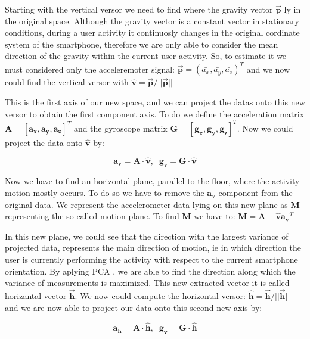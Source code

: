 Starting with the vertical versor we need to find where the gravity vector $\boldsymbol{\vec{p}}$ ly in the original space. Although the gravity vector is a constant vector in stationary conditions, during a user activity it continuosly changes in the original cordinate system of the smartphone, therefore we are only able to consider the mean direction of the gravity within the current user activity. So, to estimate it we must considered only the acceleremoter signal: $ \boldsymbol{\vec{p}} = (\bar{a_{x}}, \bar{a_{y}}, \bar{a_{z}})^{T}$  and we now could find the vertical versor with $ \boldsymbol{\hat{v}} = \boldsymbol{\vec{p}} / ||\boldsymbol{\vec{p}}|| $

This is the first axis of our new space, and we can project the datas onto this new versor to obtain the first component axis. To do we define the acceleration matrix $\boldsymbol{A} = [ \boldsymbol{a_{x}}, \boldsymbol{a_{y}}, \boldsymbol{a_{z}} ]^{T}$ and the gyroscope matrix $\boldsymbol{G} = [ \boldsymbol{g_{x}}, \boldsymbol{g_{y}}, \boldsymbol{g_{z}} ]^{T} $. Now we could project the data onto $\boldsymbol{\hat{v}}$ by:

$$ \boldsymbol{a_{v}} = \boldsymbol{A} \cdot \boldsymbol{\hat{v}} ,\;\; \boldsymbol{g_{v}} = \boldsymbol{G} \cdot \boldsymbol{\hat{v}} $$

Now we have to find an horizontal plane, parallel to the floor, where the activity motion mostly occurs. To do so we have to remove the  $\boldsymbol{a_{v}}$ component from the original data. We represent the accelerometer data lying on this new plane as $\boldsymbol{M}$ representing the so called motion plane. To find $\boldsymbol{M}$ we have to: $\boldsymbol{M} = \boldsymbol{A} - \boldsymbol{\hat{v}} \boldsymbol{a_{v}}^{T} $

In this new plane, we could see that the direction with the largest variance of projected data, represents the main direction of motion, ie in which direction the user is currently performing the activity with respect to the current smartphone orientation. By aplying PCA \cite{rao1964use}, we are able to find the direction along which the variance of measurements is maximized. This new extracted vector it is called horizantal vector $\boldsymbol{\vec{h}}$. We now could compute the horizontal versor:	$ \boldsymbol{\hat{h}} = \boldsymbol{\vec{h}} / ||\boldsymbol{\vec{h}}|| $ and we are now able to project our data onto this second new axis by:

$$ \boldsymbol{a_{h}} = \boldsymbol{A} \cdot \boldsymbol{\hat{h}} , \;\; \boldsymbol{g_{v}} = \boldsymbol{G} \cdot \boldsymbol{\hat{h}} $$

